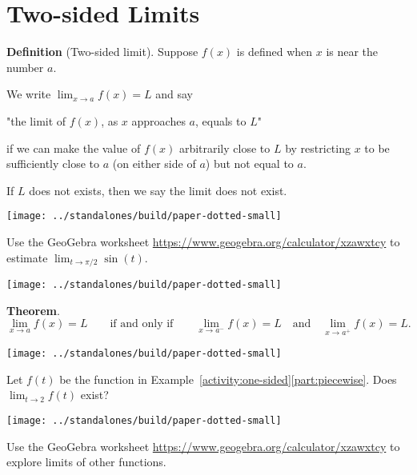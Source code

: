 \documentclass[../main.tex]{subfiles}
\begin{document}
\section{Two-sided Limits}
\begin{mdframed}[style=withref]
  \textbf{Definition} (Two-sided limit). Suppose \(f(x)\) is {defined when \(x\) is near the number \(a\).}

  We write \({\lim_{x \to a} f(x)} = L\) and say
  \begin{center}
    "the {limit} of \(f(x)\), as {\(x\) approaches \(a\)}, equals to \(L\)"
  \end{center}
  if we can {make the value of \(f(x)\) arbitrarily close to \(L\) by restricting \(x\) to be sufficiently close to \(a\) (on either side of \(a\))} {but not equal to \(a\).}

  If \(L\) does not exists, then we say the limit {does not exist.}

\end{mdframed}
\texttt{[image: ../standalones/build/paper-dotted-small]}

\begin{example}
  Use the GeoGebra worksheet \url{https://www.geogebra.org/calculator/xzawxtcy} to estimate \(\lim_{t \to \pi/2} \sin(t)\).
\end{example}
\texttt{[image: ../standalones/build/paper-dotted-small]}

\begin{mdframed}[style=withref]
  \textbf{Theorem}.
  \[
    \lim_{x \to a} f(x) = L \qquad\text{if and only if}\qquad {\lim_{x \to a^{-}} f(x) = L \quad\text{and}\quad \lim_{x \to a^{+}} f(x) = L.}
  \]

\end{mdframed}
\texttt{[image: ../standalones/build/paper-dotted-small]}

\begin{example}
  Let \(f(t)\) be the function in Example~\ref{activity:one-sided}\ref{part:piecewise}. Does \(\lim_{t \to 2} f(t)\) exist?
\end{example}
\texttt{[image: ../standalones/build/paper-dotted-small]}

\begin{example}
  Use the GeoGebra worksheet \url{https://www.geogebra.org/calculator/xzawxtcy} to explore limits of other functions.
\end{example}
\clearpage
\end{document}
